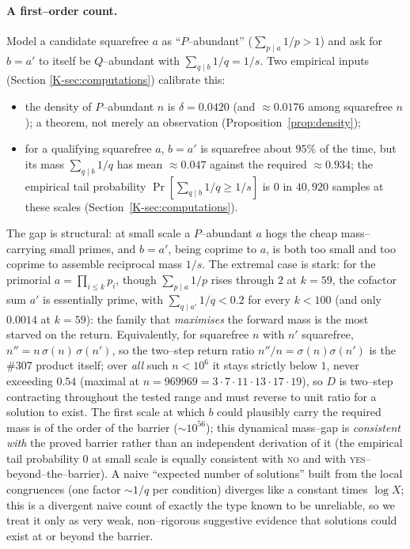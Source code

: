 \documentclass[11pt]{article}
\theoremstyle{definition}
\begin{document}
\paragraph{A first--order count.}
Model a candidate squarefree $a$ as ``$P$--abundant'' ($\sum_{p\mid a}1/p>1$) and ask for
$b=a'$ to itself be $Q$--abundant with $\sum_{q\mid b}1/q=1/s$. Two empirical inputs (Section
\ref{K-sec:computations}) calibrate this:
\begin{itemize}[leftmargin=1.4em]
\item the density of $P$--abundant $n$ is $\delta=0.0420$ (and $\approx0.0176$ among squarefree
$n$); a theorem, not merely an observation (Proposition~\ref{prop:density});
\item for a qualifying squarefree $a$, $b=a'$ is squarefree about $95\%$ of the time, but its mass
$\sum_{q\mid b}1/q$ has mean $\approx0.047$ against the required $\approx0.934$; the empirical tail
probability $\Pr[\sum_{q\mid b}1/q\ge 1/s]$ is $0$ in $40{,}920$ samples at these scales
(Section~\ref{K-sec:computations}).
\end{itemize}
The gap is structural: at small scale a $P$--abundant $a$ hogs the cheap mass--carrying small primes,
and $b=a'$, being coprime to $a$, is both too small and too coprime to assemble reciprocal mass
$1/s$. The extremal case is stark: for the primorial $a=\prod_{i\le k}p_i$, though $\sum_{p\mid a}1/p$
rises through $2$ at $k=59$, the cofactor sum $a'$ is essentially prime, with $\sum_{q\mid a'}1/q<0.2$
for every $k<100$ (and only $0.0014$ at $k=59$): the family that \emph{maximises} the forward mass is
the most starved on the return. Equivalently, for squarefree $n$ with $n'$ squarefree,
$n''=n\,\sigma(n)\,\sigma(n')$, so the two--step return ratio $n''/n=\sigma(n)\sigma(n')$ is the \#307
product itself; over \emph{all} such $n<10^6$ it stays strictly below $1$, never exceeding $0.54$
(maximal at $n=969969=3\cdot7\cdot11\cdot13\cdot17\cdot19$), so $D$ is two--step contracting throughout
the tested range and must reverse to unit ratio for a solution to exist. The first scale at which $b$
could plausibly carry the required mass is of the order of the
barrier ($\sim10^{56}$); this dynamical mass--gap is \emph{consistent with} the proved barrier rather
than an independent derivation of it (the empirical tail probability $0$ at small scale is equally
consistent with \textsc{no} and with \textsc{yes}--beyond--the--barrier). A naive ``expected number
of solutions'' built from the local congruences (one factor $\sim1/q$ per condition) diverges like a
constant times $\log X$; this is a divergent naive count of exactly the type known to be unreliable,
so we treat it only as very weak, non--rigorous suggestive evidence that solutions could exist at or
beyond the barrier.
\end{document}
